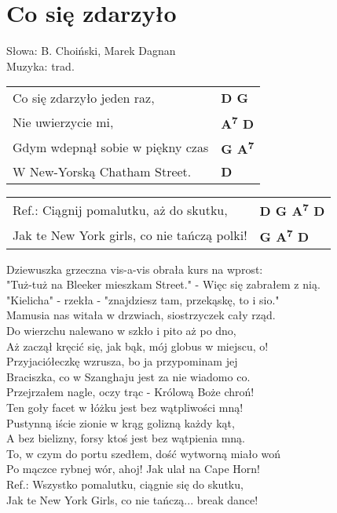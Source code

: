 \section{Co się zdarzyło}

Słowa: B. Choiński, Marek Dagnan\\
Muzyka:  trad.

\vspace{2em}
\begin{tabular}{@{}p{9cm}@{}l@{}}
Co się zdarzyło jeden raz, & \bfseries  D G \\
Nie uwierzycie mi, & \bfseries  A\textsuperscript{7} D \\
Gdym wdepnął sobie w piękny czas & \bfseries  G A\textsuperscript{7} \\
W New-Yorską Chatham Street. & \bfseries  D \\
\end{tabular}

\vspace{1em}
\begin{tabular}{@{}p{9cm}@{}l@{}}
Ref.: Ciągnij pomalutku, aż do skutku, & \bfseries  D G A\textsuperscript{7} D \\
Jak te New York girls, co nie tańczą polki! & \bfseries G A\textsuperscript{7} D \\
\end{tabular}

\vspace{1em}
Dziewuszka grzeczna vis-a-vis obrała kurs na wprost: \\
"Tuż-tuż na Bleeker mieszkam Street." - Więc się zabrałem z nią. \\

"Kielicha" - rzekła - "znajdziesz tam, przekąskę, to i sio." \\
Mamusia nas witała w drzwiach, siostrzyczek cały rząd. \\

Do wierzchu nalewano w szkło i pito aż po dno, \\
Aż zaczął kręcić się, jak bąk, mój globus w miejscu, o! \\

Przyjaciółeczkę wzrusza, bo ja przypominam jej \\
Braciszka, co w Szanghaju jest za nie wiadomo co. \\

Przejrzałem nagle, oczy trąc - Królową Boże chroń! \\
Ten goły facet w łóżku jest bez wątpliwości mną! \\

Pustynną iście zionie w krąg golizną każdy kąt, \\
A bez bielizny, forsy ktoś jest bez wątpienia mną. \\

\newpage
To, w czym do portu szedłem, dość wytworną miało woń \\
Po mączce rybnej wór, ahoj! Jak ulał na Cape Horn! \\

Ref.: Wszystko pomalutku, ciągnie się do skutku, \\
Jak te New York Girls, co nie tańczą... break dance! \\
